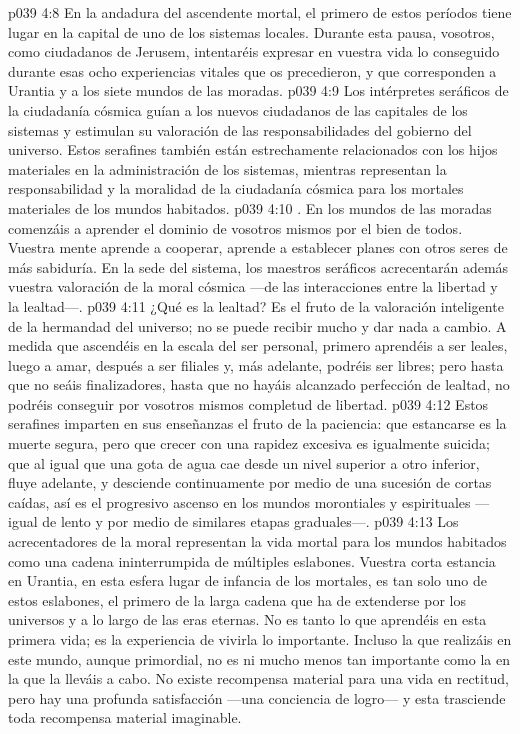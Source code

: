 \vs p039 4:8 En la andadura del ascendente mortal, el primero de estos períodos tiene lugar en la capital de uno de los sistemas locales. Durante esta pausa, vosotros, como ciudadanos de Jerusem, intentaréis expresar en vuestra vida lo conseguido durante esas ocho experiencias vitales que os precedieron, y que corresponden a Urantia y a los siete mundos de las moradas.
\vs p039 4:9 Los intérpretes seráficos de la ciudadanía cósmica guían a los nuevos ciudadanos de las capitales de los sistemas y estimulan su valoración de las responsabilidades del gobierno del universo. Estos serafines también están estrechamente relacionados con los hijos materiales en la administración de los sistemas, mientras representan la responsabilidad y la moralidad de la ciudadanía cósmica para los mortales materiales de los mundos habitados.
\vs p039 4:10 . En los mundos de las moradas comenzáis a aprender el dominio de vosotros mismos por el bien de todos. Vuestra mente aprende a cooperar, aprende a establecer planes con otros seres de más sabiduría. En la sede del sistema, los maestros seráficos acrecentarán además vuestra valoración de la moral cósmica ---de las interacciones entre la libertad y la lealtad---.
\vs p039 4:11 ¿Qué es la lealtad? Es el fruto de la valoración inteligente de la hermandad del universo; no se puede recibir mucho y dar nada a cambio. A medida que ascendéis en la escala del ser personal, primero aprendéis a ser leales, luego a amar, después a ser filiales y, más adelante, podréis ser libres; pero hasta que no seáis finalizadores, hasta que no hayáis alcanzado perfección de lealtad, no podréis conseguir por vosotros mismos completud de libertad.
\vs p039 4:12 \pc Estos serafines imparten en sus enseñanzas el fruto de la paciencia: que estancarse es la muerte segura, pero que crecer con una rapidez excesiva es igualmente suicida; que al igual que una gota de agua cae desde un nivel superior a otro inferior, fluye adelante, y desciende continuamente por medio de una sucesión de cortas caídas, así es el progresivo ascenso en los mundos morontiales y espirituales ---igual de lento y por medio de similares etapas graduales---.
\vs p039 4:13 Los acrecentadores de la moral representan la vida mortal para los mundos habitados como una cadena ininterrumpida de múltiples eslabones. Vuestra corta estancia en Urantia, en esta esfera lugar de infancia de los mortales, es tan solo uno de estos eslabones, el primero de la larga cadena que ha de extenderse por los universos y a lo largo de las eras eternas. No es tanto lo que aprendéis en esta primera vida; es la experiencia de vivirla lo importante. Incluso la  que realizáis en este mundo, aunque primordial, no es ni mucho menos tan importante como la  en la que la lleváis a cabo. No existe recompensa material para una vida en rectitud, pero hay una profunda satisfacción ---una conciencia de logro--- y esta trasciende toda recompensa material imaginable.
